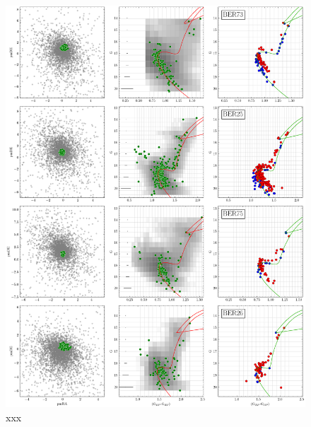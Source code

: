\documentclass[draft]{aa}
\begin{document}
\begin{appendix}
 \begin{figure}
  \centering
  \includegraphics[height=.95\textheight]{figs/0_fpars.png}
  \caption{xxx}
  \label{fig:8fpars}
 \end{figure}


\end{appendix}
\end{document}
